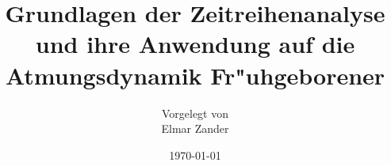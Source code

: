 \documentclass[a4paper,12pt]{scrreprt}
\def\frontmatter{}
\def\mainmatter{}
\def\backmatter{}
\begin{document}

\frontmatter

\titlepage
\subject{Diplomarbeit angefertigt am Institut f"ur Theoretische Physik
I\\Wilhelm-Klemm-Str.\  9}
\title{Grundlagen der Zeitreihenanalyse und ihre Anwendung auf die Atmungsdynamik Fr"uhgeborener}
\author{Vorgelegt von \\ Elmar Zander}
\date{\today}

\maketitle

\tableofcontents



\mainmatter

%



%

%

%


\backmatter

\begin{appendix}

\end{appendix}



\newpage
{}

%
%

\end{document}
